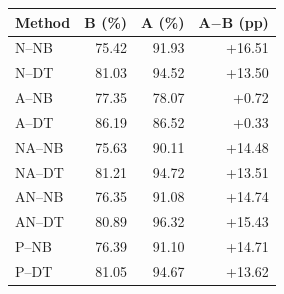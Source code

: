\begin{tabular}{lrrr}
\toprule
Method & B (\%) & A (\%) & A$-$B (pp) \\
\midrule
N--NB & 75.42 & 91.93 & +16.51 \\
N--DT & 81.03 & 94.52 & +13.50 \\
A--NB & 77.35 & 78.07 & +0.72 \\
A--DT & 86.19 & 86.52 & +0.33 \\
NA--NB & 75.63 & 90.11 & +14.48 \\
NA--DT & 81.21 & 94.72 & +13.51 \\
AN--NB & 76.35 & 91.08 & +14.74 \\
AN--DT & 80.89 & 96.32 & +15.43 \\
P--NB & 76.39 & 91.10 & +14.71 \\
P--DT & 81.05 & 94.67 & +13.62 \\
\bottomrule
\end{tabular}
